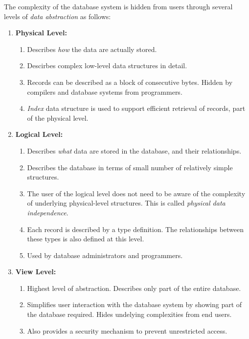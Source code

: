 \documentclass[journal,12pt,twocolumn]{IEEEtran}
\begin{document}
The complexity of the database system is hidden from users through several 
levels of \textit{data abstraction} as follows:

\begin{enumerate}
    \item \textbf{Physical Level:}
    \begin{enumerate}
        \item Describes \textit{how} the data are actually stored.
        \item Descirbes complex low-level data structures in detail.
        \item Records can be described as a block of consecutive bytes. Hidden 
        by compilers and database systems from programmers.
        \item \textit{Index} data structure is used to support efficient 
        retrieval of records, part of the physical level.
    \end{enumerate}

    \item \textbf{Logical Level:}
    \begin{enumerate}
        \item Describes \textit{what} data are stored in the database, and 
        their relationships.
        \item Describes the database in terms of small number of relatively 
        simple structures.
        \item The user of the logical level does not need to be aware of the 
        complexity of underlying physical-level structures. This is called 
        \textit{physical data independence}.
        \item Each record is described by a type definition. The relationships 
        between these types is also defined at this level.
        \item Used by database administrators and programmers.
    \end{enumerate}

    \item \textbf{View Level:}
    \begin{enumerate}
        \item Highest level of abstraction. Describes only part of the entire 
        database.
        \item Simplifies user interaction with the database system by showing 
        part of the database required. Hides undelying complexities from end users.
        \item Also provides a security mechanism to prevent unrestricted access.
    \end{enumerate}
\end{enumerate}
\end{document}
